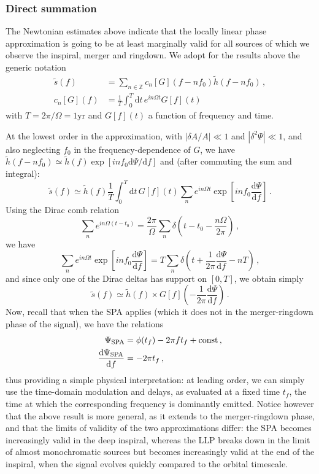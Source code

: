 \documentclass[aps,showpacs,%
prd,superscriptaddress,nofootinbib]{revtex4}
\newcommand{\be}{\begin{equation}}
\newcommand{\ee}{\end{equation}}
\newcommand\ud{{\mathrm{d}}}
\newcommand{\nn}{\nonumber}
\begin{document}




\subsubsection*{Direct summation}

The Newtonian estimates above indicate that the locally linear phase approximation is going to be at least marginally valid for all sources of which we observe the inspiral, merger and ringdown. We adopt for the results above the generic notation
%
\begin{align}
	\tilde{s}(f) &=  \sum\limits_{n\in \mathbb{Z}} c_{n}[G]\left(f - n f_{0}\right) \tilde{h}\left(f - n f_{0}\right)\,, \nn\\
	c_{n}[G](f) &= \frac{1}{T} \int_{0}^{T}\ud t\, e^{in\Omega t} G[f](t)
\end{align}
%
with $T=2\pi/\Omega=1\mathrm{yr}$ and $G[f](t)$ a function of frequency and time.

At the lowest order in the approximation, with $|\delta A/A| \ll 1$ and $|\delta^{2} \Psi | \ll 1$, and also neglecting $f_{0}$ in the frequency-dependence of $G$, we have $\tilde{h}(f-n f_{0}) \simeq \tilde{h}(f) \exp\left[ i n f_{0} \ud \Psi/\ud f \right]$ and (after commuting the sum and integral):
%
\be
	\tilde{s}(f) \simeq \tilde{h}(f) \frac{1}{T} \int_{0}^{T}\ud t\, G[f](t) \sum\limits_{n} e^{i n \Omega t} \exp\left[ i n f_{0} \frac{\ud \Psi}{\ud f} \right] \,.
\ee
%
Using the Dirac comb relation
%
\be
	\sum\limits_{n} e^{i n \Omega (t-t_{0})} = \frac{2\pi}{\Omega} \sum\limits_{n} \delta\left( t-t_{0} - \frac{n\Omega}{2\pi} \right) \,,
\ee
%
we have
%
\be
	\sum\limits_{n} e^{i n \Omega t} \exp\left[ i n f_{0} \frac{\ud \Psi}{\ud f }\right] = T \sum\limits_{n} \delta\left( t + \frac{1}{2\pi}\frac{\ud \Psi}{\ud f} - n T \right) \,,
\ee
%
and since only one of the Dirac deltas has support on $[0,T]$, we obtain simply
%
\be
	\tilde{s}(f) \simeq \tilde{h}(f) \times G[f]\left( -\frac{1}{2\pi} \frac{\ud \Psi}{\ud f} \right)\,.
\ee
%
Now, recall that when the SPA applies (which it does not in the merger-ringdown phase of the signal), we have the relations
%
\begin{align}
	\Psi_{\rm SPA} &= \phi(t_{f}) - 2\pi f t_{f} + \mathrm{const} \,,\nn\\
	\frac{\ud \Psi_{\rm SPA}}{\ud f} &= -2\pi t_{f} \,,
\end{align}
%
thus providing a simple physical interpretation: at leading order, we can simply use the time-domain modulation and delays, as evaluated at a fixed time $t_{f}$, the time at which the corresponding frequency is dominantly emitted. Notice however that the above result is more general, as it extends to the merger-ringdown phase, and that the limits of validity of the two approximations differ: the SPA becomes increasingly valid in the deep inspiral, whereas the LLP breaks down in the limit of almost monochromatic sources but becomes increasingly valid at the end of the inspiral, when the signal evolves quickly compared to the orbital timescale.
\end{document}
